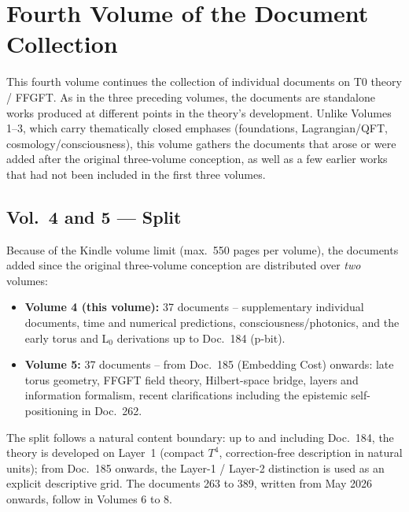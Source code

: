 
\section*{Fourth Volume of the Document Collection}

This fourth volume continues the collection of individual documents on T0
theory / FFGFT. As in the three preceding volumes, the documents are
standalone works produced at different points in the theory's development.
Unlike Volumes 1--3, which carry thematically closed emphases (foundations,
Lagrangian/QFT, cosmology/consciousness), this volume gathers the documents
that arose or were added after the original three-volume conception, as well
as a few earlier works that had not been included in the first three volumes.

\subsection*{Vol.~4 and 5 --- Split}

Because of the Kindle volume limit (max.\ 550 pages per volume), the
documents added since the original three-volume conception are distributed
over \emph{two} volumes:

\begin{itemize}
\item \textbf{Volume 4 (this volume):} 37 documents -- supplementary
      individual documents, time and numerical predictions,
      consciousness/photonics, and the early torus and L$_0$ derivations
      up to Doc.~184 (p-bit).
\item \textbf{Volume 5:} 37 documents -- from Doc.~185 (Embedding Cost)
      onwards: late torus geometry, FFGFT field theory, Hilbert-space
      bridge, layers and information formalism, recent clarifications
      including the epistemic self-positioning in Doc.~262.
\end{itemize}

The split follows a natural content boundary: up to and including Doc.~184,
the theory is developed on Layer~1 (compact $T^4$, correction-free
description in natural units); from Doc.~185 onwards, the Layer-1 /
Layer-2 distinction is used as an explicit descriptive grid. The documents
263 to 389, written from May 2026 onwards, follow in Volumes 6 to 8.

